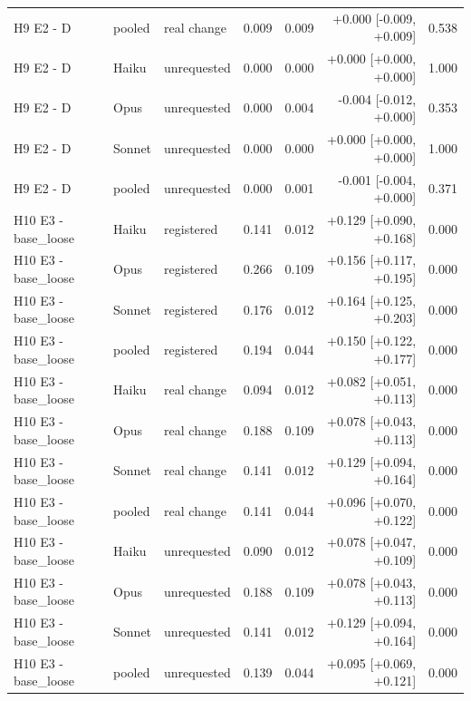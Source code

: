 \begin{tabular}{lllrrrr}
H9 E2 - D & pooled & real change & 0.009 & 0.009 & +0.000 [-0.009, +0.009] & 0.538 \\
H9 E2 - D & Haiku & unrequested & 0.000 & 0.000 & +0.000 [+0.000, +0.000] & 1.000 \\
H9 E2 - D & Opus & unrequested & 0.000 & 0.004 & -0.004 [-0.012, +0.000] & 0.353 \\
H9 E2 - D & Sonnet & unrequested & 0.000 & 0.000 & +0.000 [+0.000, +0.000] & 1.000 \\
H9 E2 - D & pooled & unrequested & 0.000 & 0.001 & -0.001 [-0.004, +0.000] & 0.371 \\
H10 E3 - base\_loose & Haiku & registered & 0.141 & 0.012 & +0.129 [+0.090, +0.168] & 0.000 \\
H10 E3 - base\_loose & Opus & registered & 0.266 & 0.109 & +0.156 [+0.117, +0.195] & 0.000 \\
H10 E3 - base\_loose & Sonnet & registered & 0.176 & 0.012 & +0.164 [+0.125, +0.203] & 0.000 \\
H10 E3 - base\_loose & pooled & registered & 0.194 & 0.044 & +0.150 [+0.122, +0.177] & 0.000 \\
H10 E3 - base\_loose & Haiku & real change & 0.094 & 0.012 & +0.082 [+0.051, +0.113] & 0.000 \\
H10 E3 - base\_loose & Opus & real change & 0.188 & 0.109 & +0.078 [+0.043, +0.113] & 0.000 \\
H10 E3 - base\_loose & Sonnet & real change & 0.141 & 0.012 & +0.129 [+0.094, +0.164] & 0.000 \\
H10 E3 - base\_loose & pooled & real change & 0.141 & 0.044 & +0.096 [+0.070, +0.122] & 0.000 \\
H10 E3 - base\_loose & Haiku & unrequested & 0.090 & 0.012 & +0.078 [+0.047, +0.109] & 0.000 \\
H10 E3 - base\_loose & Opus & unrequested & 0.188 & 0.109 & +0.078 [+0.043, +0.113] & 0.000 \\
H10 E3 - base\_loose & Sonnet & unrequested & 0.141 & 0.012 & +0.129 [+0.094, +0.164] & 0.000 \\
H10 E3 - base\_loose & pooled & unrequested & 0.139 & 0.044 & +0.095 [+0.069, +0.121] & 0.000 \\
\bottomrule
\end{tabular}
